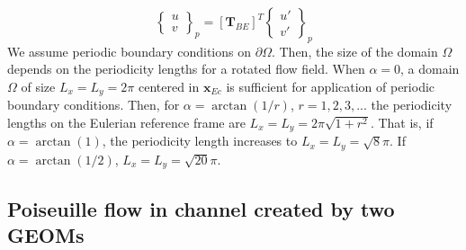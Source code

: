 \documentclass[12pt]{article}
\begin{document}
%
\begin{equation}
  \left\{ \begin{array}{c}  u \\ v \end{array} \right\}_p = [\mathbf{T}_{BE}]^T \left\{ \begin{array}{c}  u' \\ v' \end{array} \right\}_p
\end{equation}
%
We assume periodic boundary conditions on $\partial \Omega$. Then, the size of the domain $\Omega$ depends on the periodicity lengths for a rotated flow field.
When $\alpha=0$, a domain $\Omega$ of size $L_x=L_y=2\pi$ centered in $\mathbf{x}_{Ec}$ is sufficient for application of periodic boundary conditions. Then, for $\alpha=\arctan(1/r)$, $r=1,2,3,...$ the periodicity lengths on the Eulerian reference frame are $L_x=L_y=2\pi \sqrt{1+r^2}$.
That is, if $\alpha=\arctan(1)$,  the periodicity length increases to $L_x=L_y=\sqrt{8} \pi$. If $\alpha=\arctan(1/2)$, $L_x=L_y=\sqrt{20} \pi$.


\subsection{Poiseuille flow in channel created by two GEOMs}
\end{document}
